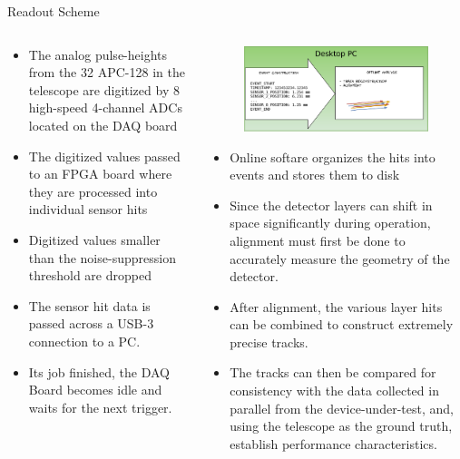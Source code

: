 \documentclass[final]{beamer}
\newlength{\onecolwide}
\newlength{\readoutimgheight}
\newlength{\readoutimgwidth}
\begin{document}
\begin{frame}[t]
\begin{exampleblock}{Readout Scheme}
\begin{columns}[t]
\begin{column}{\onecolwide}
\begin{figure}
      \end{figure}
      \small
      \begin{itemize}
      \itemsep0em 
        \item The analog pulse-heights from the 32 APC-128 in the telescope are digitized by 8 high-speed 4-channel ADCs located on the DAQ board
        \item The digitized values passed to an FPGA board where they are processed into individual sensor hits
        \item Digitized values smaller than the noise-suppression threshold are dropped
        \item The sensor hit data is passed across a USB-3 connection to a PC.\@
        \item Its job finished, the DAQ Board becomes idle and waits for the next trigger.
      \end{itemize}
    \end{column}
    \begin{column}{\onecolwide}
      \begin{figure}
        \centering
        \includegraphics[height=\readoutimgheight, width=\readoutimgwidth]{figures/Telescope_Data_Flow_Stage_III.pdf}
      \end{figure}
      \small
      \begin{itemize}
        \itemsep0em 
        \item Online softare organizes the hits into events and stores them to disk
        \item Since the detector layers can shift in space significantly during operation, alignment must first be done to accurately measure the geometry of the detector.
        \item After alignment, the various layer hits can be combined to construct extremely precise tracks.
        \item The tracks can then be compared for consistency with the data collected in parallel from the device-under-test, and, using the telescope as the ground truth, establish performance characteristics.
      \end{itemize}
    \end{column}
  \end{columns}
\end{exampleblock}



\end{frame}
\end{document}
